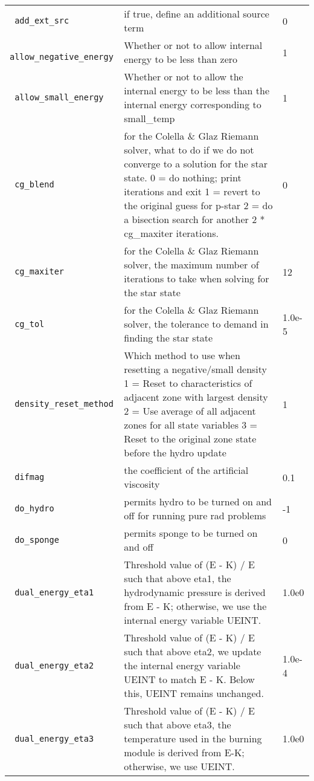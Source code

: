 \begin{landscape}
{\begin{center}
\begin{longtable}{|l|p{5.25in}|l|}
\rowcolor{tableShade}
\verb= add_ext_src = &  if true, define an additional source term & 0 \\
\verb= allow_negative_energy = &  Whether or not to allow internal energy to be less than zero & 1 \\
\rowcolor{tableShade}
\verb= allow_small_energy = &  Whether or not to allow the internal energy to be less than the internal energy corresponding to small\_temp & 1 \\
\verb= cg_blend = &  for the Colella \& Glaz Riemann solver, what to do if we do not converge to a solution for the star state. 0 = do nothing; print iterations and exit 1 = revert to the original guess for p-star 2 = do a bisection search for another 2 * cg\_maxiter iterations. & 0 \\
\rowcolor{tableShade}
\verb= cg_maxiter = &  for the Colella \& Glaz Riemann solver, the maximum number of iterations to take when solving for the star state & 12 \\
\verb= cg_tol = &  for the Colella \& Glaz Riemann solver, the tolerance to demand in finding the star state & 1.0e-5 \\
\rowcolor{tableShade}
\verb= density_reset_method = &  Which method to use when resetting a negative/small density 1 = Reset to characteristics of adjacent zone with largest density 2 = Use average of all adjacent zones for all state variables 3 = Reset to the original zone state before the hydro update & 1 \\
\verb= difmag = &  the coefficient of the artificial viscosity & 0.1 \\
\rowcolor{tableShade}
\verb= do_hydro = &  permits hydro to be turned on and off for running pure rad problems & -1 \\
\verb= do_sponge = &  permits sponge to be turned on and off & 0 \\
\rowcolor{tableShade}
\verb= dual_energy_eta1 = &  Threshold value of (E - K) / E such that above eta1, the hydrodynamic pressure is derived from E - K; otherwise, we use the internal energy variable UEINT. & 1.0e0 \\
\verb= dual_energy_eta2 = &  Threshold value of (E - K) / E such that above eta2, we update the internal energy variable UEINT to match E - K. Below this, UEINT remains unchanged. & 1.0e-4 \\
\rowcolor{tableShade}
\verb= dual_energy_eta3 = &  Threshold value of (E - K) / E such that above eta3, the temperature used in the burning module is derived from E-K; otherwise, we use UEINT. & 1.0e0 \\

\end{longtable}
\end{center}}
\end{landscape}
